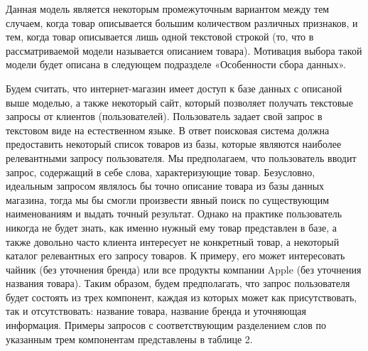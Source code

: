 \documentclass[12pt,a4paper]{article}
\begin{document}
\begin{table}[H]
\begin{center}
    \caption{Пример данных в базе интернет-магазина}
\end{center}
\end{table}

\noindent 
Данная модель является некоторым промежуточным вариантом между тем случаем, когда товар описывается большим количеством различных признаков, и тем, когда товар описывается лишь одной текстовой строкой (то, что в рассматриваемой модели называется описанием товара). Мотивация выбора такой модели будет описана в следующем подразделе «Особенности сбора данных».\textbf{}

Будем считать, что интернет-магазин имеет доступ к базе данных с описаной выше моделью, а также некоторый сайт, который позволяет получать текстовые запросы от клиентов (пользователей). Пользователь задает свой запрос в текстовом виде на естественном языке. В ответ поисковая система должна предоставить некоторый список товаров из базы, которые являются наиболее релевантными запросу пользователя. Мы предполагаем, что пользователь вводит запрос, содержащий в себе слова, характеризующие товар. Безусловно, идеальным запросом являлось бы точно описание товара из базы данных магазина, тогда мы бы смогли произвести явный поиск по существующим наименованиям и выдать точный результат. Однако на практике пользователь никогда не будет знать, как именно нужный ему товар представлен в базе, а также довольно часто клиента интересует не конкретный товар, а некоторый каталог релевантных его запросу товаров. К примеру, его может интересовать чайник (без уточнения бренда) или все продукты компании Apple (без уточнения названия товара). Таким образом, будем предполагать, что запрос пользователя будет состоять из трех компонент, каждая из которых может как присутствовать, так и отсутствовать: название товара, название бренда и уточняющая информация. Примеры запросов с соответствующим разделением слов по указанным трем компонентам представлены в таблице 2.
\end{document}
